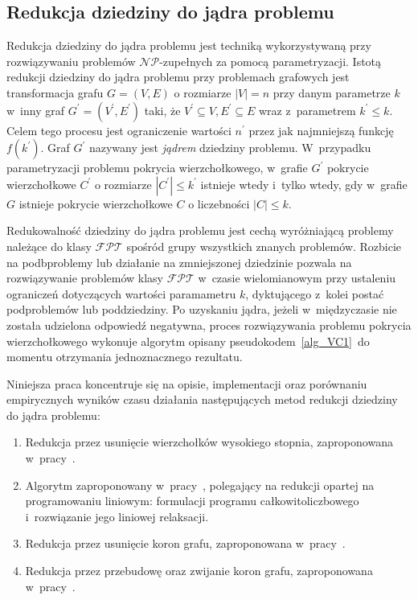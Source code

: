 \subsection{Redukcja dziedziny do jądra problemu}\label{subsection_kernelization}
\par{
  Redukcja dziedziny do jądra problemu jest techniką wykorzystywaną przy
  rozwiązywaniu problemów $\mathcal{NP}$-zupełnych za pomocą parametryzacji.
  Istotą redukcji dziedziny do jądra problemu przy problemach grafowych
  jest transformacja grafu $G=(V,E)$ o rozmiarze $|V|=n$ przy danym parametrze $k$ w~inny
  graf $G^{\prime}=(V^{\prime}, E^{\prime})$ taki, że $V^{\prime} \subseteq V, E^{\prime} \subseteq E$
  wraz z~parametrem $k^{\prime} \leq k$.
  Celem tego procesu jest ograniczenie wartości $n^{\prime}$ przez jak najmniejszą
  funkcję $f(k^{\prime})$.
  Graf $G^{\prime}$ nazywany jest \emph{jądrem} dziedziny problemu.
  W~przypadku parametryzacji problemu pokrycia wierzchołkowego, w~grafie
  $G^{\prime}$ pokrycie wierzchołkowe $C^{\prime}$ o rozmiarze $|C^{\prime}|\leq k^{\prime}$ istnieje wtedy i~tylko wtedy, gdy w~grafie $G$ istnieje pokrycie wierzchołkowe $C$ o liczebności $|C| \leq k$.
}
\par{
  Redukowalność dziedziny do jądra problemu jest cechą wyróżniającą problemy 
  należące do klasy $\mathcal{FPT}$ spośród grupy wszystkich znanych problemów.
  Rozbicie na podbproblemy lub działanie na zmniejszonej dziedzinie pozwala na
  rozwiązywanie problemów klasy $\mathcal{FPT}$ w~czasie wielomianowym przy
  ustaleniu ograniczeń dotyczących wartości paramametru $k$, dyktującego z~kolei
  postać podproblemów lub poddziedziny.
  Po uzyskaniu jądra, jeżeli w~międzyczasie nie została udzielona odpowiedź negatywna, proces rozwiązywania problemu pokrycia wierzchołkowego
  wykonuje algorytm opisany pseudokodem~\ref{alg_VC1}\ do momentu otrzymania jednoznacznego rezultatu.
}
\par{
  Niniejsza praca koncentruje się na opisie, implementacji oraz porównaniu
  empirycznych wyników czasu działania następujących metod redukcji dziedziny do
  jądra problemu:
  \begin{enumerate}
    \item Redukcja przez usunięcie wierzchołków wysokiego stopnia, zaproponowana
      w~pracy~\cite{KernelizationAlgorithms04}.
    \item Algorytm zaproponowany w~pracy~\cite{KernelizationAlgorithms04}, polegający
      na redukcji opartej na programowaniu liniowym: formulacji programu
      całkowitoliczbowego i~rozwiązanie jego liniowej relaksacji.
    \item Redukcja przez usunięcie koron grafu, zaproponowana
      w~pracy~\cite{abukhzam03}.
    \item Redukcja przez przebudowę oraz zwijanie koron grafu, zaproponowana
      w~pracy~\cite{ImprovedBounds10}.
  \end{enumerate}
}
